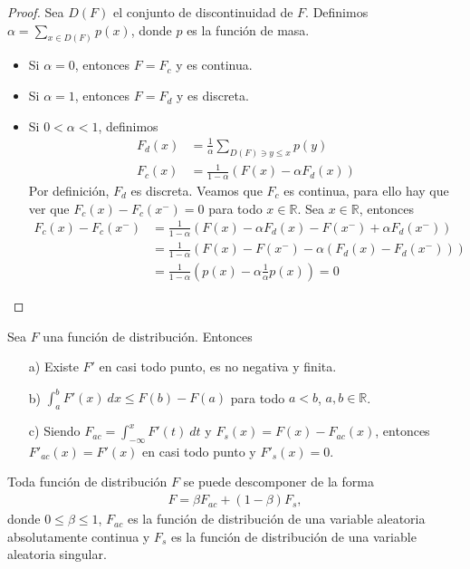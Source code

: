 \begin{proof}
    Sea $D(F)$ el conjunto de discontinuidad de $F$. Definimos $\alpha = \sum_{x \in D(F)} p(x)$, donde $p$ es la función de masa.
    \begin{itemize}
        \item Si $\alpha = 0$, entonces $F = F_c$ y es continua.
        \item Si $\alpha = 1$, entonces $F = F_d$ y es discreta.
        \item Si $0 < \alpha < 1$, definimos
              \begin{align*}
                  F_d(x) & = \frac{1}{\alpha} \sum_{ D(F) \ni y \leq x} p(y) \\
                  F_c(x) & = \frac{1}{1-\alpha}(F(x) - \alpha F_d(x))
              \end{align*}
              Por definición, $F_d$ es discreta. Veamos que $F_c$ es continua, para ello hay que ver que $F_c(x) - F_c(x^-) = 0$ para todo $x \in \mathbb{R}$. Sea $x \in \mathbb{R}$, entonces
              \begin{align*}
                  F_c(x) - F_c(x^-) & = \frac{1}{1-\alpha}(F(x) - \alpha F_d(x) - F(x^-) + \alpha F_d(x^-))    \\
                                    & = \frac{1}{1-\alpha}(F(x) - F(x^-) - \alpha (F_d(x) - F_d(x^-)))         \\
                                    & = \frac{1}{1-\alpha}\left(p(x) - \alpha \frac{1}{\alpha} p(x)\right) = 0
              \end{align*}
    \end{itemize}
\end{proof}

\begin{lema}
    Sea $F$ una función de distribución. Entonces
    \begin{enumerate}
        \item[a)] Existe $F'$ en casi todo punto, es no negativa y finita.
        \item[b)] $\int_{a}^{b} F'(x) \ dx \leq F(b) - F(a)$ para todo $a < b$, $a,b \in \mathbb{R}$.
        \item[c)] Siendo $F_{ac} = \int_{-\infty}^{x} F'(t) \ dt$ y $F_s(x) = F(x) - F_{ac}(x)$, entonces $F'_{ac}(x) = F'(x)$ en casi todo punto y $F'_s(x) = 0$.
    \end{enumerate}
\end{lema}

\begin{teo}
    Toda función de distribución $F$ se puede descomponer de la forma
    \begin{align*}
        F = \beta F_{ac} + (1-\beta)F_s,
    \end{align*}
    donde $0 \leq \beta \leq 1$, $F_{ac}$ es la función de distribución de una variable aleatoria absolutamente continua y $F_s$ es la función de distribución de una variable aleatoria singular.
\end{teo}

